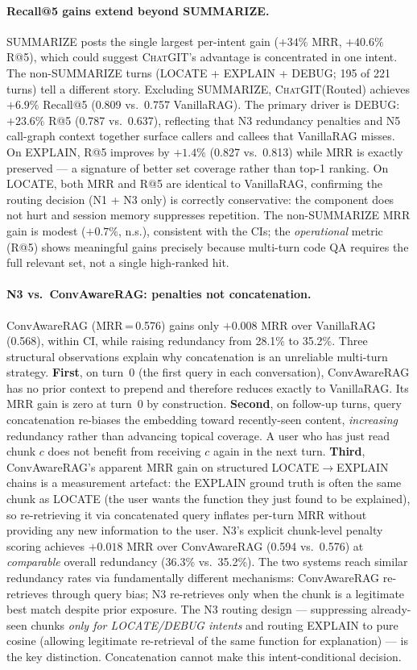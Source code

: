 \documentclass[runningheads]{llncs}
\newcommand{\chatgit}{\textsc{ChatGIT}\xspace}
\begin{document}
\paragraph{Recall@5 gains extend beyond SUMMARIZE.}
SUMMARIZE posts the single largest per-intent gain ($+34\%$ MRR,
$+40.6\%$ R@5), which could suggest \chatgit's advantage is
concentrated in one intent. The non-SUMMARIZE turns (LOCATE +
EXPLAIN + DEBUG; 195 of 221 turns) tell a different story.
Excluding SUMMARIZE, \chatgit (Routed) achieves $+6.9\%$ Recall@5
(0.809 vs.\ 0.757 VanillaRAG). The primary driver is DEBUG:
$+23.6\%$ R@5 (0.787 vs.\ 0.637), reflecting that N3 redundancy
penalties and N5 call-graph context together surface callers and
callees that VanillaRAG misses. On EXPLAIN, R@5 improves by $+1.4\%$
(0.827 vs.\ 0.813) while MRR is exactly preserved --- a signature
of better set coverage rather than top-1 ranking. On LOCATE, both
MRR and R@5 are identical to VanillaRAG, confirming the routing
decision (N1 + N3 only) is correctly conservative: the component
does not hurt and session memory suppresses repetition.
The non-SUMMARIZE MRR gain is modest ($+0.7\%$, n.s.), consistent
with the CIs; the \emph{operational} metric (R@5) shows meaningful
gains precisely because multi-turn code QA requires the full
relevant set, not a single high-ranked hit.

\paragraph{N3 vs.\ ConvAwareRAG: penalties not concatenation.}
ConvAwareRAG (MRR\,=\,0.576) gains only $+0.008$ MRR over
VanillaRAG (0.568), within CI, while raising redundancy from
28.1\% to 35.2\%. Three structural observations explain why
concatenation is an unreliable multi-turn strategy.
\textbf{First}, on turn~0 (the first query in each conversation),
ConvAwareRAG has no prior context to prepend and therefore reduces
exactly to VanillaRAG. Its MRR gain is zero at turn~0 by construction.
\textbf{Second}, on follow-up turns, query concatenation re-biases the
embedding toward recently-seen content, \emph{increasing} redundancy
rather than advancing topical coverage. A user who has just read chunk
$c$ does not benefit from receiving $c$ again in the next turn.
\textbf{Third}, ConvAwareRAG's apparent MRR gain on structured
LOCATE$\to$EXPLAIN chains is a measurement artefact: the EXPLAIN
ground truth is often the same chunk as LOCATE (the user wants the
function they just found to be explained), so re-retrieving it via
concatenated query inflates per-turn MRR without providing any new
information to the user.
N3's explicit chunk-level penalty scoring achieves $+0.018$ MRR over
ConvAwareRAG (0.594 vs.\ 0.576) at \emph{comparable} overall
redundancy (36.3\% vs.\ 35.2\%). The two systems reach similar
redundancy rates via fundamentally different mechanisms:
ConvAwareRAG re-retrieves through query bias; N3 re-retrieves
only when the chunk is a legitimate best match despite prior
exposure. The N3 routing design --- suppressing already-seen chunks
\emph{only for LOCATE/DEBUG intents} and routing EXPLAIN to pure
cosine (allowing legitimate re-retrieval of the same function for
explanation) --- is the key distinction. Concatenation cannot make
this intent-conditional decision.
\end{document}
